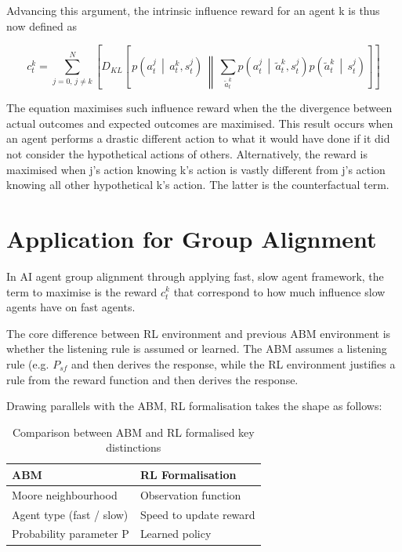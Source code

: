 \documentclass{article}
\begin{document}
Advancing this argument, the intrinsic influence reward for an agent k is thus now defined as 

\begin{equation}
    c_t^k = \sum_{j=0,\, j\neq k}^{N} \left[ D_{KL}\!\left[\, p\!\left(a_t^j \,\middle|\, a_t^k, s_t^j\right) \,\middle\|\, \sum_{\tilde{a}_t^k} p\!\left(a_t^j \,\middle|\, \tilde{a}_t^k, s_t^j\right) p\!\left(\tilde{a}_t^k \,\middle|\, s_t^j\right) \right] \right]
\end{equation} 

The equation maximises such influence reward when the the divergence between actual outcomes and expected outcomes are maximised. This result occurs when an agent performs a drastic different action to what it would have done if it did not consider the hypothetical actions of others. Alternatively, the reward is maximised when j's action knowing k's action is vastly different from j's action knowing all other hypothetical k's action. The latter is the counterfactual term.




\section{Application for Group Alignment}

In AI agent group alignment through applying fast, slow agent framework, the term to maximise is the reward $c^k_t$ that correspond to how much influence slow agents have on fast agents.

The core difference between RL environment and previous ABM environment is whether the listening rule is assumed or learned. The ABM assumes a listening rule (e.g. $P_{sf}$ and then derives the response, while the RL environment justifies a rule from the reward function and then derives the response. 

Drawing parallels with the ABM, RL formalisation takes the shape as follows:



\begin{table}[htbp]
    \centering
    \begin{tabular}{ll}
        \toprule
        \textbf{ABM} & \textbf{RL Formalisation} \\
        \midrule
        Moore neighbourhood & Observation function \\
        Agent type (fast / slow) & Speed to update reward \\
        Probability parameter P & Learned policy \\
        \bottomrule
    \end{tabular}
    \caption{Comparison between ABM and RL formalised key distinctions}
    \label{tab:abm_rl_comparison}
\end{table}
\end{document}
